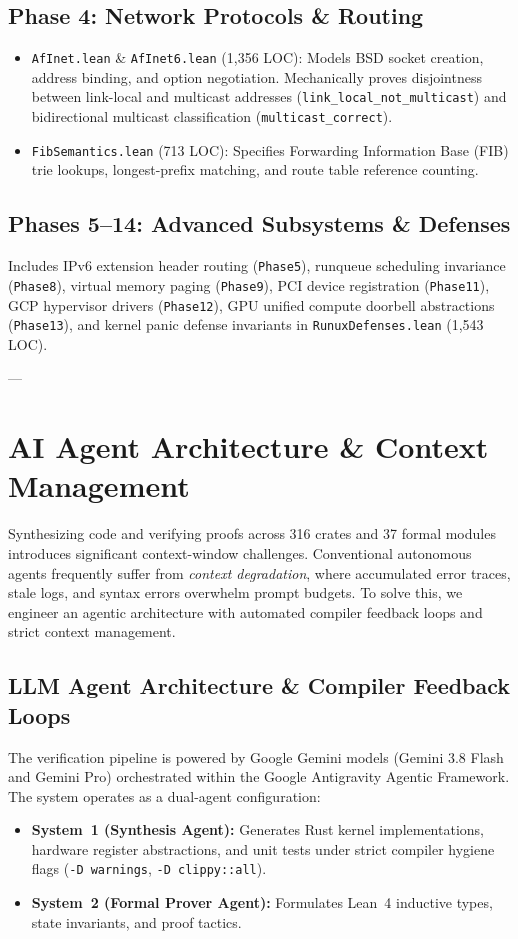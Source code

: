 \documentclass[10pt,twocolumn,letterpaper]{article}
\theoremstyle{definition}
\begin{document}
\subsection{Phase 4: Network Protocols \& Routing}
\begin{itemize}
    \item \texttt{AfInet.lean} \& \texttt{AfInet6.lean} (1,356 LOC): Models BSD socket creation, address binding, and option negotiation. Mechanically proves disjointness between link-local and multicast addresses (\texttt{link\_local\_not\_multicast}) and bidirectional multicast classification (\texttt{multicast\_correct}).
    \item \texttt{FibSemantics.lean} (713 LOC): Specifies Forwarding Information Base (FIB) trie lookups, longest-prefix matching, and route table reference counting.
\end{itemize}

\subsection{Phases 5--14: Advanced Subsystems \& Defenses}
Includes IPv6 extension header routing (\texttt{Phase5}), runqueue scheduling invariance (\texttt{Phase8}), virtual memory paging (\texttt{Phase9}), PCI device registration (\texttt{Phase11}), GCP hypervisor drivers (\texttt{Phase12}), GPU unified compute doorbell abstractions (\texttt{Phase13}), and kernel panic defense invariants in \texttt{RunuxDefenses.lean} (1,543 LOC).

---

\section{AI Agent Architecture \& Context Management}
\label{sec:ai_and_context}

Synthesizing code and verifying proofs across 316 crates and 37 formal modules introduces significant context-window challenges. Conventional autonomous agents frequently suffer from \textit{context degradation}, where accumulated error traces, stale logs, and syntax errors overwhelm prompt budgets. To solve this, we engineer an agentic architecture with automated compiler feedback loops and strict context management.

\subsection{LLM Agent Architecture \& Compiler Feedback Loops}
\label{sec:agent_arch}
The verification pipeline is powered by Google Gemini models (Gemini 3.8 Flash and Gemini Pro) orchestrated within the Google Antigravity Agentic Framework. The system operates as a dual-agent configuration:
\begin{itemize}
    \item \textbf{System~1 (Synthesis Agent):} Generates Rust kernel implementations, hardware register abstractions, and unit tests under strict compiler hygiene flags (\texttt{-D warnings}, \texttt{-D clippy::all}).
    \item \textbf{System~2 (Formal Prover Agent):} Formulates Lean~4 inductive types, state invariants, and proof tactics.
\end{itemize}
\end{document}
